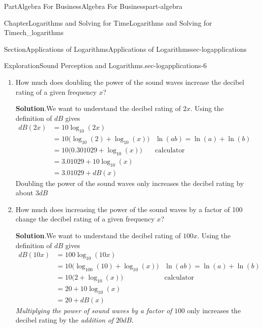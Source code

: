 \documentclass[oneside,10pt,]{tufte-book}
\newcommand{\blocktitlefont}{\relax}
\numberwithin{equation}{chapter}
\newcommand{\amp}{&}
\begin{document}
\begin{partptx}{Part}{Algebra For Business}{}{Algebra For Business}{}{}{part-algebra}
\begin{chapterptx}{Chapter}{Logarithms and Solving for Time}{}{Logarithms and Solving for Time}{}{}{ch_logarithms}
\begin{sectionptx}{Section}{Applications of Logarithms}{}{Applications of Logarithms}{}{}{sec-logapplications}
\begin{exploration}{Exploration}{Sound Perception and Logarithms.}{sec-logapplications-6}
\begin{enumerate}[font=\bfseries,label=(\alph*),ref=\alph*]
\par\smallskip%
\noindent\textbf{\blocktitlefont Solution}.\hypertarget{sec-logapplications-6-5-2}{}\quad{}\(dB(100,000,000)=10\cdot\log_{10}(100,000,000) = 10\cdot\log_{10}(10^8) = 80\) decibels.%
\par
The decibel rating of an alarm clock (80 dB) is twice the decibel rating of a quiet library (40 dB), so the library sounds twice as loud.%
\par
But surprisingly, this apparent doubling is actually the result of a \(\frac{100,000,000}{10,000}=10,000\)-fold increase in the power of the waves.%
\item{}How much does doubling the power of the sound waves increase the decibel rating of a given frequency \(x\)?%
\par\smallskip%
\noindent\textbf{\blocktitlefont Solution}.\hypertarget{sec-logapplications-6-6-2}{}\quad{}We want to understand the decibel rating of \(2x\). Using the definition of \(dB\) gives%
\begin{align*}
dB(2x) \amp = 10 \log_{10}(2x) \amp \\
\amp = 10\Big(\log_{10}(2) + \log_{10}(x)\Big) \amp \ln(ab)=\ln(a)+\ln(b)\\
\amp = 10\Big(0.301029 + \log_{10}(x)\Big) \amp \text{calculator}\\
\amp = 3.01029 + 10\log_{10}(x)  \amp \\
\amp = 3.01029 + dB(x)  \amp 
\end{align*}
Doubling the power of the sound waves only increases the decibel rating by about \(3dB\)%
\item{}How much does increasing the power of the sound waves by a factor of 100 change the decibel rating of a given frequency \(x\)?%
\par\smallskip%
\noindent\textbf{\blocktitlefont Solution}.\hypertarget{sec-logapplications-6-7-2}{}\quad{}We want to understand the decibel rating of \(100x\). Using the definition of \(dB\) gives%
\begin{align*}
dB(10x) \amp = 100 \log_{10}(10x) \amp \\
\amp = 10\Big(\log_{100}(10) + \log_{10}(x)\Big) \amp \ln(ab)=\ln(a)+\ln(b)\\
\amp = 10\Big(2 + \log_{10}(x)\Big) \amp \text{calculator}\\
\amp = 20 + 10\log_{10}(x)  \amp \\
\amp = 20 + dB(x)  \amp 
\end{align*}
\emph{Multiplying the power of sound waves by a factor of \(100\)} only increases the decibel rating by the \emph{addition of \(20dB\)}.%

\end{enumerate}
\end{exploration}
\end{sectionptx}
\end{chapterptx}
\end{partptx}
\end{document}
